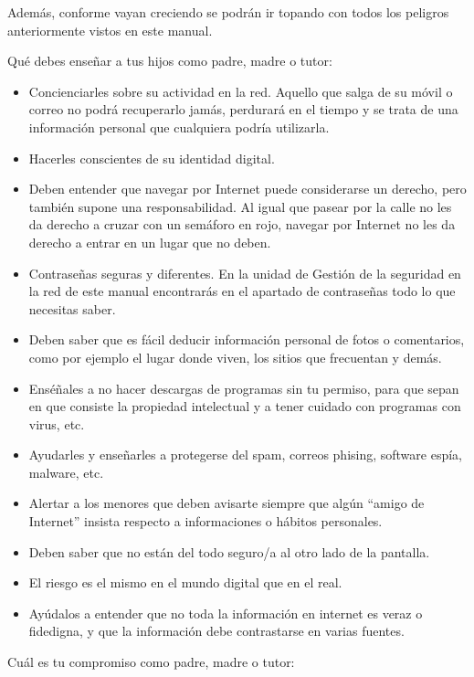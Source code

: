\documentclass[
  spanish,
  a4paper,
  openany]{book}
\begin{document}
Además, conforme vayan creciendo se podrán ir topando con todos los peligros anteriormente vistos en este manual.

Qué debes enseñar a tus hijos como padre, madre o tutor:

\begin{itemize}
\item
  Concienciarles sobre su actividad en la red. Aquello que salga de su móvil o correo no podrá recuperarlo jamás, perdurará en el tiempo y se trata de una información personal que cualquiera podría utilizarla.
\item
  Hacerles conscientes de su identidad digital.
\item
  Deben entender que navegar por Internet puede considerarse un derecho, pero también supone una responsabilidad. Al igual que pasear por la calle no les da derecho a cruzar con un semáforo en rojo, navegar por Internet no les da derecho a entrar en un lugar que no deben.
\item
  Contraseñas seguras y diferentes. En la unidad de Gestión de la seguridad en la red de este manual encontrarás en el apartado de contraseñas todo lo que necesitas saber.
\item
  Deben saber que es fácil deducir información personal de fotos o comentarios, como por ejemplo el lugar donde viven, los sitios que frecuentan y demás.
\item
  Enséñales a no hacer descargas de programas sin tu permiso, para que sepan en que consiste la propiedad intelectual y a tener cuidado con programas con virus, etc.
\item
  Ayudarles y enseñarles a protegerse del spam, correos phising, software espía, malware, etc.
\item
  Alertar a los menores que deben avisarte siempre que algún ``amigo de Internet'' insista respecto a informaciones o hábitos personales.
\item
  Deben saber que no están del todo seguro/a al otro lado de la pantalla.
\item
  El riesgo es el mismo en el mundo digital que en el real.
\item
  Ayúdalos a entender que no toda la información en internet es veraz o fidedigna, y que la información debe contrastarse en varias fuentes.
\end{itemize}

Cuál es tu compromiso como padre, madre o tutor:
\end{document}
